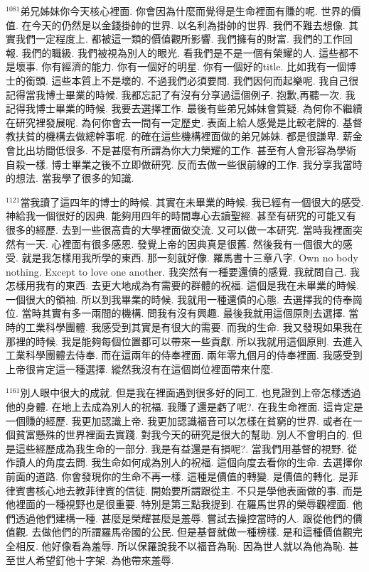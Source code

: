 \documentclass{book}
\begin{document}
$^{1081}$弟兄姊妹你今天核心裡面.
你會因為什麼而覺得是生命裡面有賺的呢.
世界的價值.
在今天的仍然是以金錢掛帥的世界.
以名利為掛帥的世界.
我們不難去想像.
其實我們一定程度上.
都被這一類的價值觀所影響.
我們擁有的財富.
我們的工作回報.
我們的職級.
我們被視為別人的眼光.
看我們是不是一個有榮耀的人.
這些都不是壞事.
你有經濟的能力.
你有一個好的明星.
你有一個好的title.
比如我有一個博士的銜頭.
這些本質上不是壞的.
不過我們必須要問.
我們因何而起樂呢.
我自己很記得當我博士畢業的時候.
我都忘記了有沒有分享過這個例子.
抱歉,再聽一次.
我記得我博士畢業的時候.
我要去選擇工作.
最後有些弟兄姊妹會質疑.
為何你不繼續在研究裡發展呢.
為何你會去一間有一定歷史.
表面上給人感覺是比較老牌的.
基督教扶貧的機構去做總幹事呢.
的確在這些機構裡面做的弟兄姊妹.
都是很謙卑.
薪金會比出坊間低很多.
不是甚麼有所謂為你大力榮耀的工作.
甚至有人會形容為學術自殺一樣.
博士畢業之後不立即做研究.
反而去做一些很前線的工作.
我分享我當時的想法.
當我學了很多的知識.

$^{1121}$當我讀了這四年的博士的時候.
其實在未畢業的時候.
我已經有一個很大的感受.
神給我一個很好的因典.
能夠用四年的時間專心去讀聖經.
甚至有研究的可能又有很多的經歷.
去到一些很高貴的大學裡面做交流.
又可以做一本研究.
當時我裡面突然有一天.
心裡面有很多感恩.
發覺上帝的因典真是很舊.
然後我有一個很大的感受.
就是我怎樣用我所學的東西.
那一刻就好像.
羅馬書十三章八字.
Own no body nothing.
Except to love one another.
我突然有一種要還債的感覺.
我就問自己.
我怎樣用我有的東西.
去更大地成為有需要的群體的祝福.
這個是我在未畢業的時候.
一個很大的領袖.
所以到我畢業的時候.
我就用一種還債的心態.
去選擇我的侍奉崗位.
當時其實有多一兩間的機構.
問我有沒有興趣.
最後我就用這個原則去選擇.
當時的工業科學團體.
我感受到其實是有很大的需要.
而我的生命.
我又發現如果我在那裡的時候.
我是能夠每個位置都可以帶來一些貢獻.
所以我就用這個原則.
去進入工業科學團體去侍奉.
而在這兩年的侍奉裡面.
兩年零九個月的侍奉裡面.
我感受到上帝很肯定這一種選擇.
縱然我沒有在這個崗位裡面帶來什麼.

$^{1161}$別人眼中很大的成就.
但是我在裡面遇到很多好的同工.
也見證到上帝怎樣透過他的身體.
在地上去成為別人的祝福.
我賺了還是虧了呢?.
在我生命裡面.
這肯定是一個賺的經歷.
我更加認識上帝.
我更加認識福音可以怎樣在貧窮的世界.
或者在一個貧富懸殊的世界裡面去實踐.
對我今天的研究是很大的幫助.
別人不會明白的.
但是這些經歷成為我生命的一部分.
我是有益還是有損呢?.
當我們用基督的視野.
從作讀人的角度去問.
我生命如何成為別人的祝福.
這個向度去看你的生命.
去選擇你前面的道路.
你會發現你的生命不再一樣.
這種是價值的轉變.
是價值的轉化.
是菲律賓書核心地去教菲律賓的信徒.
開始要所謂跟從主.
不只是學他表面做的事.
而是他裡面的一種視野也是很重要.
特別是第三點我提到.
在羅馬世界的榮辱觀裡面.
他們透過他們建構一種.
甚麼是榮耀甚麼是羞辱.
嘗試去操控當時的人.
跟從他們的價值觀.
去做他們的所謂羅馬帝國的公民.
但是基督就做一種榜樣.
是和這種價值觀完全相反.
他好像看為羞辱.
所以保羅說我不以福音為恥.
因為世人就以為他為恥.
甚至世人希望釘他十字架.
為他帶來羞辱.
\end{document}
